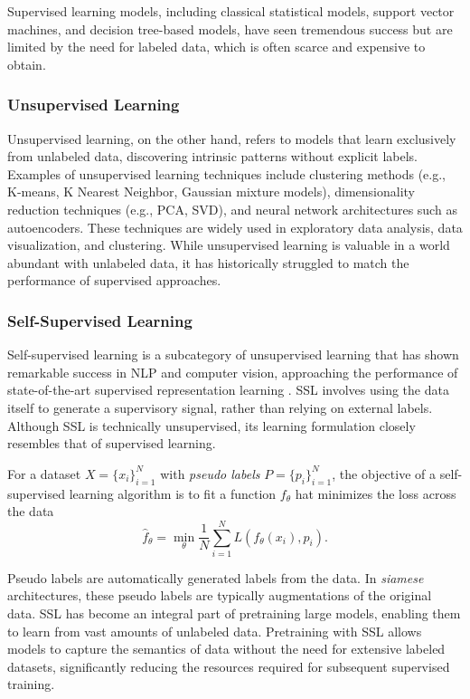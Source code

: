 \documentclass[../../thesis.tex]{subfiles}
\begin{document}
Supervised learning models, including classical statistical models, support vector machines, and decision tree-based models, have seen tremendous success but are limited by the need for labeled data, which is often scarce and expensive to obtain.

\subsubsection*{Unsupervised Learning}

Unsupervised learning, on the other hand, refers to models that learn exclusively from unlabeled data, discovering intrinsic patterns without explicit labels. Examples of unsupervised learning techniques include clustering methods (e.g., K-means, K Nearest Neighbor, Gaussian mixture models), dimensionality reduction techniques (e.g., PCA, SVD), and neural network architectures such as autoencoders. These techniques are widely used in exploratory data analysis, data visualization, and clustering. While unsupervised learning is valuable in a world abundant with unlabeled data, it has historically struggled to match the performance of supervised approaches.

\subsubsection*{Self-Supervised Learning}

Self-supervised learning is a subcategory of unsupervised learning that has shown remarkable success in NLP and computer vision, approaching the performance of state-of-the-art supervised representation learning \cite{bardes2022vicreg, zbontar2021barlow}. SSL involves using the data itself to generate a supervisory signal, rather than relying on external labels. Although SSL is technically unsupervised, its learning formulation closely resembles that of supervised learning.\newline

For a dataset $X = \{x_i\}_{i=1}^N$ with \textit{pseudo labels} $P = \{p_i\}_{i=1}^N$, the objective of a self-supervised learning algorithm is to fit a function $f_\theta$ hat minimizes the loss across the data
\begin{equation}
    \widehat{f}_\theta = \min_\theta \frac{1}{N} \sum_{i=1}^N L(f_\theta(x_i),p_i).
\end{equation}

Pseudo labels are automatically generated labels from the data. In \textit{siamese} architectures, these pseudo labels are typically augmentations of the original data. SSL has become an integral part of pretraining large models, enabling them to learn from vast amounts of unlabeled data. Pretraining with SSL allows models to capture the semantics of data without the need for extensive labeled datasets, significantly reducing the resources required for subsequent supervised training.
\end{document}
